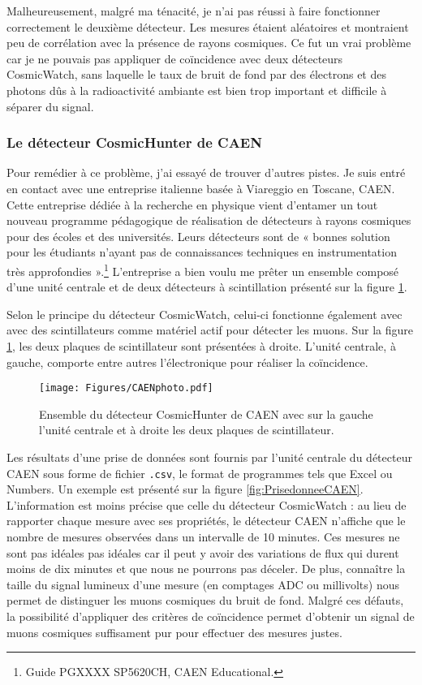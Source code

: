\documentclass[a4paper, 12pt]{article}
\begin{document}
\begin{spacing}{1.5}
Malheureusement, malgré ma ténacité, je n'ai pas réussi à faire fonctionner correctement le deuxième détecteur. Les mesures étaient aléatoires et montraient peu de corrélation avec la présence de rayons cosmiques. Ce fut un vrai problème car je ne pouvais pas appliquer de coïncidence avec deux détecteurs CosmicWatch, sans laquelle le taux de bruit de fond par des électrons et des photons dûs à la radioactivité ambiante est bien trop important et difficile à séparer du signal. 

\subsubsection{Le détecteur CosmicHunter de CAEN}

Pour remédier à ce problème, j'ai essayé de trouver d'autres pistes. Je suis entré en contact avec une entreprise italienne basée à Viareggio en Toscane, CAEN. Cette entreprise dédiée à la recherche en physique vient d'entamer un tout nouveau programme pédagogique de réalisation de détecteurs à rayons cosmiques pour des écoles et des universités. Leurs détecteurs sont de « bonnes solution pour les étudiants n'ayant pas de connaissances techniques en instrumentation très approfondies ».\footnote{Guide PGXXXX SP5620CH, CAEN Educational.} L'entreprise a bien voulu me prêter un ensemble composé d'une unité centrale et de deux détecteurs à scintillation présenté sur la figure \ref{fig:CAENphoto}. 

Selon le principe du détecteur CosmicWatch, celui-ci fonctionne également avec avec des scintillateurs comme matériel actif pour détecter les muons. Sur la figure \ref{fig:CAENphoto}, les deux plaques de scintillateur sont présentées à droite. L'unité centrale, à gauche, comporte entre autres l'électronique pour réaliser la coïncidence.

\begin{figure}[t]
\begin{center}
\texttt{[image: Figures/CAENphoto.pdf]}
\caption{\label{fig:CAENphoto} Ensemble du détecteur CosmicHunter de CAEN avec sur la gauche l'unité centrale et à droite les deux plaques de scintillateur.}
\end{center}
\end{figure}

Les résultats d'une prise de données sont fournis par l'unité centrale du détecteur CAEN sous forme de fichier {\tt *.csv}, le format de programmes tels que Excel ou Numbers. Un exemple est présenté sur la figure \ref{fig:PrisedonneeCAEN}. L'information est moins précise que celle du détecteur CosmicWatch : au lieu de rapporter chaque mesure avec ses propriétés, le détecteur CAEN n'affiche que le nombre de mesures observées dans un intervalle de 10 minutes. Ces mesures ne sont pas idéales pas idéales car il peut y avoir des variations de flux qui durent moins de dix minutes et que nous ne pourrons pas déceler. De plus, connaître la taille du signal lumineux d'une mesure (en comptages ADC ou millivolts) nous permet de distinguer les muons cosmiques du bruit de fond. Malgré ces défauts, la possibilité d'appliquer des critères de coïncidence permet d'obtenir un signal de muons cosmiques suffisament pur pour effectuer des mesures justes.


\end{spacing}
\end{document}
